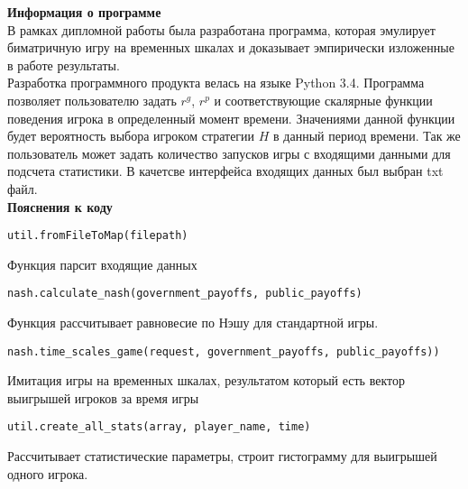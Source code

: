 

\textbf{Информация о программе}\\
 В рамках дипломной работы была разработана программа, которая эмулирует биматричную игру на временных шкалах и доказывает эмпирически изложенные в работе результаты. 
\\
Разработка программного продукта велась на языке Python 3.4.
Программа позволяет пользователю задать $r^g$, $r^p$ и соответствующие скалярные функции поведения игрока в определенный момент времени. Значениями данной функции будет вероятность выбора игроком  стратегии $H$ в данный период времени. Так же пользователь может задать количество запусков игры с входящими данными для подсчета статистики. В качетсве интерфейса входящих данных был выбран txt файл.\\

\textbf{Пояснения к коду}
\begin{lstlisting}[style=csharpinlinestyle]
util.fromFileToMap(filepath) 
\end{lstlisting}
Функция парсит входящие данных

\begin{lstlisting}[style=csharpinlinestyle]
nash.calculate_nash(government_payoffs, public_payoffs)
\end{lstlisting}
Функция рассчитывает равновесие по Нэшу для стандартной игры.


\begin{lstlisting}[style=csharpinlinestyle]
nash.time_scales_game(request, government_payoffs, public_payoffs))
\end{lstlisting}
Имитация игры на временных шкалах, результатом который есть вектор выигрышей игроков за время игры

\begin{lstlisting}[style=csharpinlinestyle]
util.create_all_stats(array, player_name, time)
\end{lstlisting}
Рассчитывает статистические параметры, строит гистограмму для выигрышей одного игрока.


